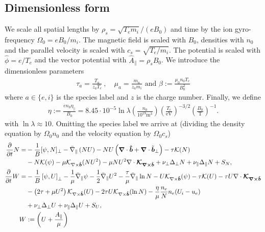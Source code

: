 \subsection{Dimensionless form}
We scale all spatial lengths by $\rho_s = \sqrt{T_e m_i}/(eB_0)$ and time by the ion gyro-frequency $\Omega_0 = eB_0/m_i$.
The magnetic field is scaled with $B_0$, densities with $n_0$ and the parallel velocity is scaled with $c_s = \sqrt{T_e/m_i}$.
The potential is scaled with $\hat \phi = e/T_e$ and the vector potential with
$\hat A_\parallel = \rho_s B_0$.
We introduce the dimensionless parameters
\begin{align}
  \tau_a = \frac{T_a}{z_aT_e}~,\quad \mu_a = \frac{m_a}{z_am_i}\text{ and } 
  \beta:=\frac{\mu_0 n_0 T_e}{B_0^2}
  \label{}
\end{align}
where $a\in\{e,i\}$ is the species label and $z$ is the charge number. Finally, we define
\begin{align}
  \eta:=\frac{en_0\eta_\parallel}{B_0} = 8.45\cdot 10^{-5}\ln \lambda \left(\frac{n_0}{10^{19}\text{m}^3}\right) \left(\frac{T_e}{\text{eV}}\right)^{-3/2} \left(\frac{B_0}{\text{T}}\right)^{-1}.
    \label{eq:resistivity}
\end{align}
with $\ln \lambda \approx 10$.
Omitting the species label we arrive at (dividing the density equation by $\Omega_0n_0$ and the velocity equation by $\Omega_0 c_s$)
\begin{subequations}
    \begin{align}
    \frac{\partial}{\partial t} N =&
        - \frac{1}{B}[\psi, N]_{\perp}%
        - \bar \nabla_\parallel \left( NU\right)
        - NU\left(\vec \nabla\cdot\bhat+\vec \nabla\cdot\tilde{\vec b}_\perp\right)
        - \tau \mathcal K(N) \nonumber \\&
        - N \mathcal K(\psi)
        -\mu \mathcal K_{\nabla\times\bhat}(NU^2)
        -\mu NU^2\nabla\cdot \vec{ \mathcal K_{\nabla\times\bhat}}
        + \nu_\perp\Delta_\perp N + \nu_\parallel \Delta_\parallel N + S_N, \\
    \frac{\partial}{\partial t} W =&
        - \frac{1}{B}\left[\psi, U\right]_{\perp}%
        - \frac{1}{\mu} \bar \nabla_\parallel \psi%
        - \frac{1}{2}\bar \nabla_\parallel U^2
        -\frac{\tau}{\mu} \bar \nabla_\parallel \ln N
        - U\mathcal K_{\nabla\times\bhat}(\psi)
        - \tau \mathcal K(U)
        -\tau U\nabla\cdot\vec{ \mathcal K_{\nabla\times\bhat}}\nonumber\\&
        - \left(2\tau + {\mu}U^2\right) \mathcal K_{\nabla\times\bhat} (U)
        -2\tau U\mathcal K_{\nabla\times\bhat}(\ln N)
        - \frac{\eta}{\mu} \frac{n_e}{N}n_e(U_i - u_e) \nonumber\\&
        + \nu_\perp\Delta_\perp U
        + \nu_\parallel \Delta_\parallel U + S_U,
        \label{eq:EgyrofluidU} \\
        W&:= \left( U + \frac{A_\parallel}{\mu}\right)
    \end{align}
    \label{eq:Egyrofluid}
\end{subequations}
